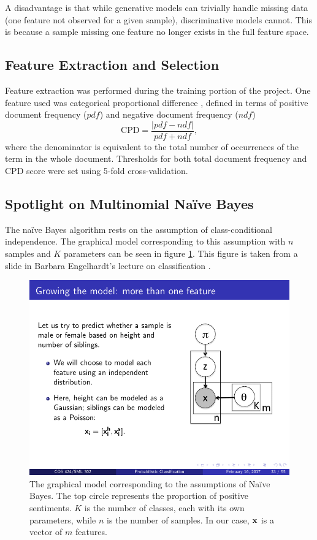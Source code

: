 \documentclass{article} %
\begin{document}
	A disadvantage is that while generative models can trivially handle missing data (one feature not observed for a given sample), discriminative models cannot. This is because a sample missing one feature no longer exists in the full feature space.
	
	\subsection{Feature Extraction and Selection}
	
	Feature extraction was performed during the training portion of the project. One feature used was categorical proportional difference \cite{oKeefe2009}, defined in terms of positive document frequency ($pdf$) and negative document frequency ($ndf$)
	\begin{equation}
	\mbox{CPD} = \frac{|pdf - ndf|}{pdf + ndf},
	\end{equation}
	where the denominator is equivalent to the total number of occurrences of the term in the whole document. Thresholds for both total document frequency and CPD score were set using 5-fold cross-validation.
	
	\subsection{Spotlight on Multinomial Na\"ive Bayes}
	
	The na\"ive Bayes algorithm rests on the assumption of class-conditional independence. The graphical model corresponding to this assumption with $n$ samples and $K$ parameters can be seen in figure \ref{fig:dag}. This figure is taken from a slide in Barbara Engelhardt's lecture on classification \cite{engelhardt17}.
	
	\begin{figure}[h]
		\centering
		\includegraphics[scale=1]{DAG}
		\caption{The graphical model corresponding to the assumptions of Na\"ive Bayes. The top circle represents the proportion of positive sentiments. $K$ is the number of classes, each with its own parameters, while $n$ is the number of samples. In our case, $\bf x$ is a vector of $m$ features.}
		\label{fig:dag}
	\end{figure}
	
\end{document}
